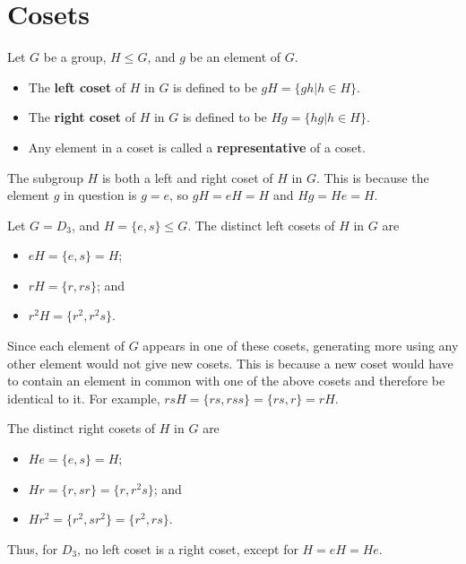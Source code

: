 \section{Cosets}
\begin{definition}
    Let $G$ be a group, $H \leq G$, and $g$ be an element of $G$.
    \begin{itemize}
        \item The \textbf{left coset} of $H$ in $G$ is defined to be $gH = \{gh \vert h \in H\}$.
        \item The \textbf{right coset} of $H$ in $G$ is defined to be $Hg = \{hg \vert h \in H\}$.
        \item Any element in a coset is called a \textbf{representative} of a coset.
    \end{itemize}
\end{definition}
\begin{remark}
    The subgroup $H$ is both a left and right coset of $H$ in $G$. This is because the element $g$ in question is $g = e$, so $gH = eH = H$ and $Hg = He = H$.
\end{remark}

\begin{example}
    Let $G = D_3$, and $H = \{e, s\} \leq G$. The distinct left cosets of $H$ in $G$ are
    \begin{itemize}
        \item $eH = \{e, s\} = H$;
        \item $rH = \{r, rs\}$; and
        \item $r^2H = \{r^2, r^2s\}$.
    \end{itemize}
    Since each element of $G$ appears in one of these cosets, generating more using any other element would not give new cosets. This is because a new coset would have to contain an element in common with one of the above cosets and therefore be identical to it. For example, $rsH = \{rs, rss\} = \{rs, r\} = rH$.

    The distinct right cosets of $H$ in $G$ are
    \begin{itemize}
        \item $He = \{e, s\} = H$;
        \item $Hr = \{r, sr\} = \{r, r^2s\}$; and
        \item $Hr^2 = \{r^2, sr^2\} = \{r^2, rs\}$.
    \end{itemize}
    Thus, for $D_3$, no left coset is a right coset, except for $H = eH = He$.
\end{example}

